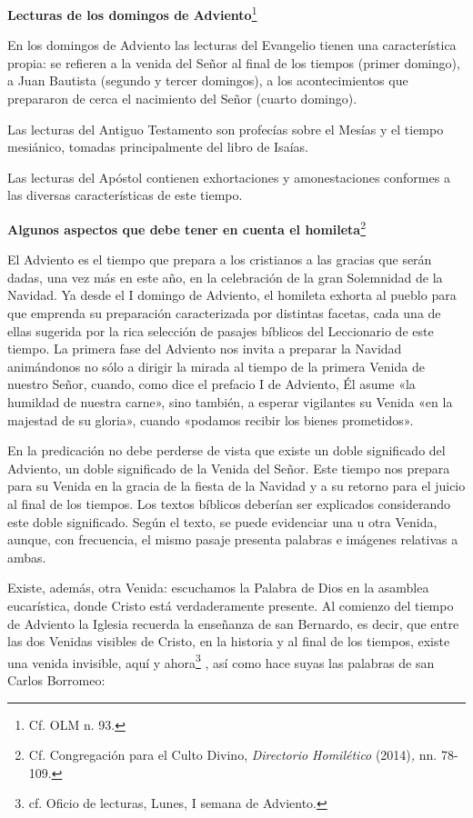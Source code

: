 \documentclass[]{article}
\begin{document}
\textbf{Lecturas de los domingos de Adviento}\footnote{Cf. OLM n. 93.}

En los domingos de Adviento las lecturas del Evangelio tienen una
característica propia: se refieren a la venida del Señor al final de los
tiempos (primer domingo), a Juan Bautista (segundo y tercer domingos), a
los acontecimientos que prepararon de cerca el nacimiento del Señor
(cuarto domingo).

Las lecturas del Antiguo Testamento son profecías sobre el Mesías y el
tiempo mesiánico, tomadas principalmente del libro de Isaías.

Las lecturas del Apóstol contienen exhortaciones y amonestaciones
conformes a las diversas características de este tiempo.

\textbf{Algunos aspectos que debe tener en cuenta el homileta}\footnote{Cf.
	Congregación para el Culto Divino, \emph{Directorio Homilético}
	(2014)\emph{,} nn. 78-109.}

El Adviento es el tiempo que prepara a los cristianos a las gracias que
serán dadas, una vez más en este año, en la celebración de la gran
Solemnidad de la Navidad. Ya desde el I domingo de Adviento, el homileta
exhorta al pueblo para que emprenda su preparación caracterizada por
distintas facetas, cada una de ellas sugerida por la rica selección de
pasajes bíblicos del Leccionario de este tiempo. La primera fase del
Adviento nos invita a preparar la Navidad animándonos no sólo a dirigir
la mirada al tiempo de la primera Venida de nuestro Señor, cuando, como
dice el prefacio I de Adviento, Él asume «la humildad de nuestra carne»,
sino también, a esperar vigilantes su Venida «en la majestad de su
gloria», cuando «podamos recibir los bienes prometidos».

En la predicación no debe perderse de vista que existe un doble
significado del Adviento, un doble significado de la Venida del Señor.
Este tiempo nos prepara para su Venida en la gracia de la fiesta de la
Navidad y a su retorno para el juicio al final de los tiempos. Los
textos bíblicos deberían ser explicados considerando este doble
significado. Según el texto, se puede evidenciar una u otra Venida,
aunque, con frecuencia, el mismo pasaje presenta palabras e imágenes
relativas a ambas.

Existe, además, otra Venida: escuchamos la Palabra de Dios en la
asamblea eucarística, donde Cristo está verdaderamente presente. Al
comienzo del tiempo de Adviento la Iglesia recuerda la enseñanza de san
Bernardo, es decir, que entre las dos Venidas visibles de Cristo, en la
historia y al final de los tiempos, existe una venida invisible, aquí y
ahora\footnote{cf. Oficio de lecturas, Lunes, I semana de Adviento.} ,
así como hace suyas las palabras de san Carlos Borromeo:
\end{document}
